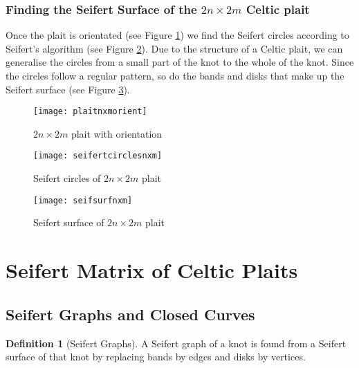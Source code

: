 \documentclass[10pt,a4paper]{report}
\theoremstyle{definition}
\newtheorem{definition}{Definition}[section]
\theoremstyle{remark}
\theoremstyle{example}
\begin{document}
\subsubsection{Finding the Seifert Surface of the $2n \times 2m$ Celtic plait}

Once the plait is orientated (see Figure \ref{plaitnxmorient}) we find the Seifert circles according to Seifert's algorithm (see Figure \ref{seifertcirclesnxm}). Due to the structure of a Celtic plait, we can generalise the circles from a small part of the knot to the whole of the knot. Since the circles follow a regular pattern, so do the bands and disks that make up the Seifert surface (see Figure \ref{seifsurfnxm}). 

 \begin{figure}[H]
\centering
\graphicspath{{/Users/Imogen/Desktop/seifertimages/lapath/}}
\texttt{[image: plaitnxmorient]}
\caption{$2n \times 2m$ plait with orientation}
\label{plaitnxmorient}
\end{figure}

 \begin{figure}[H]
\centering
\graphicspath{{/Users/Imogen/Desktop/seifertimages/lapath/}}
\texttt{[image: seifertcirclesnxm]}
\caption{Seifert circles of $2n \times 2m$ plait}
\label{seifertcirclesnxm}
\end{figure}
 
 \begin{figure}[H]
\centering
\graphicspath{{/Users/Imogen/Desktop/seifertimages/lapath/}}
\texttt{[image: seifsurfnxm]}
\caption{Seifert surface of $2n \times 2m$ plait}
\label{seifsurfnxm}
\end{figure}

   
\section{Seifert Matrix of Celtic Plaits}

\subsection{Seifert Graphs and Closed Curves}

\begin{definition}[Seifert Graphs]

A Seifert graph of a knot is found from a Seifert surface of that knot by replacing bands by edges and disks by vertices.
\end{definition}
\end{document}
